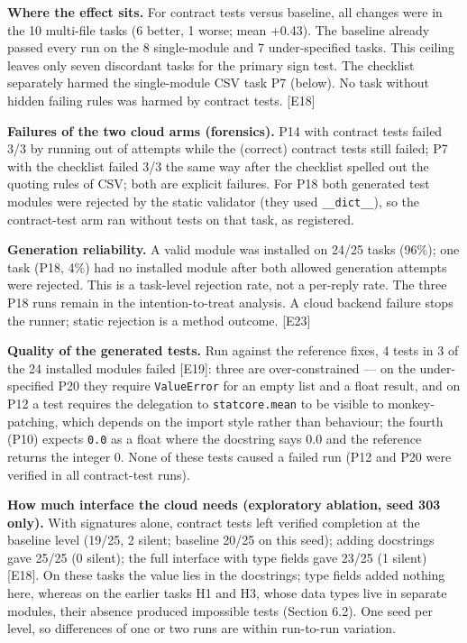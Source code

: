 \documentclass[11pt]{article}
\newcommand{\code}[1]{\texttt{#1}}
\begin{document}
\textbf{Where the effect sits.} For contract tests versus baseline, all changes were in the 10 multi-file tasks (6 better, 1 worse; mean +0.43). The baseline already passed every run on the 8 single-module and 7 under-specified tasks. This ceiling leaves only seven discordant tasks for the primary sign test. The checklist separately harmed the single-module CSV task P7 (below). No task without hidden failing rules was harmed by contract tests. [E18]

\textbf{Failures of the two cloud arms (forensics).} P14 with contract tests failed 3/3 by running out of attempts while the (correct) contract tests still failed; P7 with the checklist failed 3/3 the same way after the checklist spelled out the quoting rules of CSV; both are explicit failures. For P18 both generated test modules were rejected by the static validator (they used \code{\_\allowbreak{}\_\allowbreak{}dict\_\allowbreak{}\_\allowbreak{}}), so the contract-test arm ran without tests on that task, as registered.

\textbf{Generation reliability.} A valid module was installed on 24/25 tasks (96\%); one task (P18, 4\%) had no installed module after both allowed generation attempts were rejected. This is a task-level rejection rate, not a per-reply rate. The three P18 runs remain in the intention-to-treat analysis. A cloud backend failure stops the runner; static rejection is a method outcome. [E23]

\textbf{Quality of the generated tests.} Run against the reference fixes, 4 tests in 3 of the 24 installed modules failed [E19]: three are over-constrained — on the under-specified P20 they require \code{ValueError} for an empty list and a float result, and on P12 a test requires the delegation to \code{statcore.\allowbreak{}mean} to be visible to monkey-patching, which depends on the import style rather than behaviour; the fourth (P10) expects \code{0.\allowbreak{}0} as a float where the docstring says 0.0 and the reference returns the integer 0. None of these tests caused a failed run (P12 and P20 were verified in all contract-test runs).

\textbf{How much interface the cloud needs (exploratory ablation, seed 303 only).} With signatures alone, contract tests left verified completion at the baseline level (19/25, 2 silent; baseline 20/25 on this seed); adding docstrings gave 25/25 (0 silent); the full interface with type fields gave 23/25 (1 silent) [E18]. On these tasks the value lies in the docstrings; type fields added nothing here, whereas on the earlier tasks H1 and H3, whose data types live in separate modules, their absence produced impossible tests (Section 6.2). One seed per level, so differences of one or two runs are within run-to-run variation.
\end{document}
